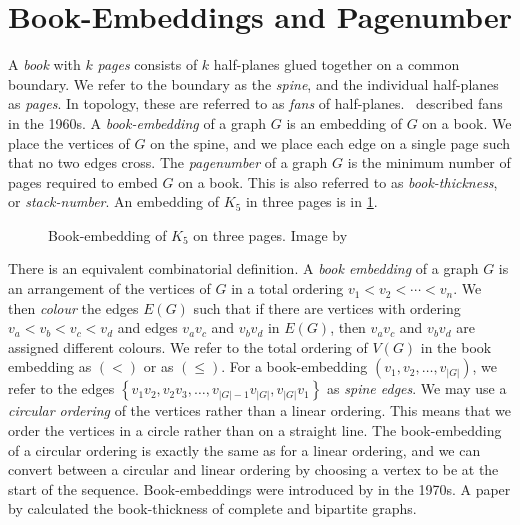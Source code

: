 \section{Book-Embeddings and Pagenumber}\label{sec:Book Embedding}
A \textit{book} with \(k\) \textit{pages} consists of \(k\) half-planes glued together on a common boundary. We refer to the boundary as the \textit{spine}, and the individual half-planes as \textit{pages}. In topology, these are referred to as \textit{fans} of half-planes.\ \textcite{persingerSubsetsNbooksE31966,atneosenOnedimensionalNleavedContinua1972} described fans in the 1960s.
A \textit{book-embedding} of a graph \(G\) is an embedding of \(G\) on a book. We place the vertices of \(G\) on the spine, and we place each edge on a single page such that no two edges cross.
The \textit{pagenumber} of a graph \(G\) is the minimum number of pages required to embed \(G\) on a book. This is also referred to as \textit{book-thickness}, or \textit{stack-number}. An embedding of $K_5$ in three pages is in \cref{fig:book-embedding}.
\begin{figure}[h!]\label{fig:book-embedding}
	\centering
	
	\caption{Book-embedding of $K_5$ on three pages. Image by \textcite{eppsteinBookEmbedding2014}}
\end{figure}
\par
There is an equivalent combinatorial definition. A \textit{book embedding} of a graph \(G\) is an arrangement of the vertices of \(G\) in a total ordering \(v_1 < v_2 < \cdots < v_n\). We then \textit{colour} the edges \(E(G)\) such that if there are vertices with ordering \(v_a < v_b < v_c < v_d\) and edges \(v_a v_c\) and \(v_b v_d\) in $E(G)$, then $v_a v_c$ and $v_b v_d$ are assigned different colours.
We refer to the total ordering of \(V(G)\) in the book embedding as \((<)\) or as \((\leq)\). For a book-embedding \((v_1, v_2, \ldots, v_{|G|})\), we refer to the edges \( \left\{ v_1 v_2, v_2 v_3, \ldots, v_{|G| - 1}v_{|G|}, v_{|G|}v_{1} \right\} \) as \textit{spine edges}.
We may use a \textit{circular ordering} of the vertices rather than a linear ordering. This means that we order the vertices in a circle rather than on a straight line. The book-embedding of a circular ordering is exactly the same as for a linear ordering, and we can convert between a circular and linear ordering by choosing a vertex to be at the start of the sequence.
Book-embeddings were introduced by \textcite{kainenRecentResultsTopological1974, ollmannBookThicknessVarious1973} in the 1970s. A paper by \textcite{bernhartBookThicknessGraph1979} calculated the book-thickness of complete and bipartite graphs.
